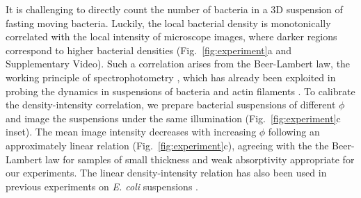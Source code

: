 \documentclass[twocolumn,aps,prl,amsmath,amssymb,longbibliography]{revtex4-2}
\begin{document}
It is challenging to directly count the number of bacteria in a 3D suspension of fasting moving bacteria. Luckily, the local bacterial density is monotonically correlated with the local intensity of microscope images, where darker regions correspond to higher bacterial densities (Fig.~\ref{fig:experiment}a and Supplementary Video). Such a correlation arises from the Beer-Lambert law, the working principle of spectrophotometry \cite{Tortora2018}, which has already been exploited in probing the dynamics in suspensions of bacteria and actin filaments \cite{Sokolov2009, Wilson2011, Schaller2013}.
To calibrate the density-intensity correlation, we prepare bacterial suspensions of different $\phi$ and image the suspensions under the same illumination (Fig.~\ref{fig:experiment}c inset). The mean image intensity decreases with increasing $\phi$ following an approximately linear relation (Fig.~\ref{fig:experiment}c), agreeing with the the Beer-Lambert law for samples of small thickness and weak absorptivity appropriate for our experiments. The linear density-intensity relation has also been used in previous experiments on \textit{E. coli} suspensions \cite{Wilson2011}.
\end{document}
